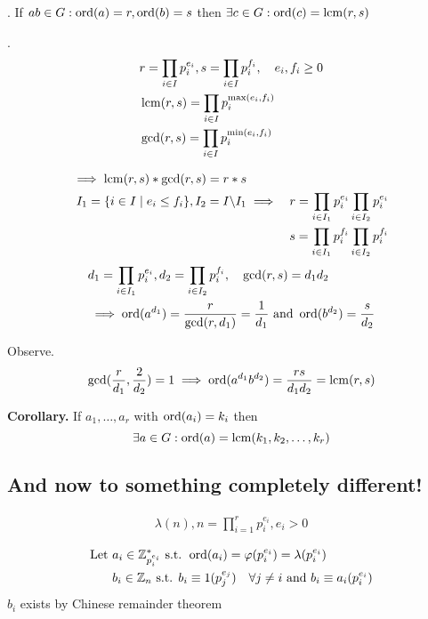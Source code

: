 \Theorem.
If $ab \in G: \operatorname{ord}(a)=r, \operatorname{ord}(b) = s$ then $\exists c \in G: \operatorname{ord}(c) = \operatorname{lcm}(r,s)$

\Proof.
\begin{align*}
  &r = \prod_{i\in I} p_i^{e_i}, s = \prod_{i\in I} p_i^{f_i}, \quad  e_i, f_i \geq 0\\
  &\operatorname{lcm}(r,s) = \prod_{i\in I} p_i^{\max(e_i,f_i)}\\
  &\gcd(r,s) = \prod_{i\in I} p_i^{\min(e_i,f_i)}
\end{align*}

\begin{align*}
  \implies \operatorname{lcm}(r,s) * \gcd(r,s) = r*s\\
  I_1 = \{i \in I \mid e_i \leq f_i\}, I_2 = I \backslash I_1 
  & \implies
     & r = \prod_{i\in I_1} p_i^{e_i} \prod_{i\in I_2} p_i^{e_i} \\
    && s = \prod_{i\in I_1} p_i^{f_i} \prod_{i\in I_2} p_i^{f_i} \\
\end{align*}
\begin{align*}
  &d_1 = \prod_{i\in I_1} p_i^{e_i}, d_2 = \prod_{i\in I_2} p_i^{f_i}, \quad \gcd(r,s) = d_1 d_2 \\
  &\implies \operatorname{ord}(a^{d_1}) = \frac{r}{\gcd(r,d_1)} = \frac{1}{d_1} \text{ and } \operatorname{ord}(b^{d_2}) = \frac{s}{d_2}
\end{align*}

Observe.
\begin{align*}
  \gcd(\frac{r}{d_1}, \frac{2}{d_2} ) = 1 
    \implies \operatorname{ord}(a^{d_1} b^{d_2}) =
    \frac{rs}{d_1 d_2} = \operatorname{lcm}(r,s)
\end{align*}

\textbf{Corollary.}
If $a_1, \ldots, a_r$ with $\operatorname{ord}(a_i) = k_i$ then 
\[
  \exists a \in G: \operatorname{ord}(a) = \operatorname{lcm}(k_1, k_2, \ldots, k_r)
\]


\subsection{And now to something completely different!}
\begin{align*}
  \lambda(n), n = \prod_{i = 1}^{r} p_i^{e_i}, e_i > 0
\end{align*}

\begin{align*}
\text{Let } &a_i \in \mathbb{Z}_{p_i^{e_i}}^{*} \text{ s.t. } \operatorname{ord}(a_i) = \varphi(p_i^{e_i}) = \lambda(p_i^{e_i})\\
  &b_i \in \mathbb{Z}_n \text{ s.t. } b_i \equiv 1 (p_j^{e_j}) \quad \forall j \neq i \text{ and } b_i \equiv a_i (p_i^{e_i})
\end{align*}
$b_i$ exists by Chinese remainder theorem

